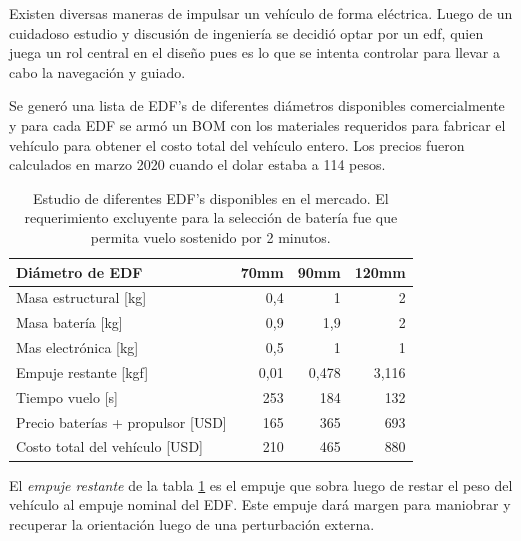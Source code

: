 Existen diversas maneras de impulsar un vehículo de forma eléctrica. Luego de un cuidadoso estudio y discusión de ingeniería se decidió optar por un \gls{edf}, quien juega un rol central en el diseño pues es lo que se intenta controlar para llevar a cabo la navegación y guiado.


\medskip

Se generó una lista de EDF's de diferentes diámetros disponibles comercialmente y para cada EDF se armó un BOM con los materiales requeridos para fabricar el vehículo para obtener el costo total del vehículo entero.
Los precios fueron calculados en marzo 2020 cuando el dolar estaba a 114 pesos.

\begin{table}[!ht]
    \centering
    \begin{tabular}{l|r|r|r}
Diámetro de EDF    & \multicolumn{1}{l|}{70mm} & \multicolumn{1}{l|}{90mm} & \multicolumn{1}{l}{120mm} \\ \hline
    Masa estructural {[}kg{]}           & 0,4                       & 1                         & 2                          \\ \hline
    Masa batería       {[}kg{]}         & 0,9                       & 1,9                       & 2                          \\ \hline
    Mas electrónica {[}kg{]}            & 0,5                       & 1                         & 1                          \\ \hline
    Empuje restante {[}kgf{]}           & 0,01                      & 0,478                     & 3,116                      \\ \hline
    Tiempo vuelo {[}s{]}                & 253              & 184              & 132                \\ \hline
    Precio baterías + propulsor {[}USD{]} & 165                   & 365                   & 693                   \\ \hline
    Costo total del vehículo {[}USD{]}               & 210              & 465              & 880                 \\ \hline
    \end{tabular}
    \caption{Estudio de diferentes EDF's disponibles en el mercado. El requerimiento excluyente para la selección de batería fue que permita vuelo sostenido por 2 minutos.}
    \label{tab:edfseleccion}
\end{table}


El \textit{empuje restante} de la tabla \ref{tab:edfseleccion} es el empuje que sobra luego de restar el peso del vehículo al empuje nominal del EDF. Este empuje dará margen para maniobrar y recuperar la orientación luego de una perturbación externa.


